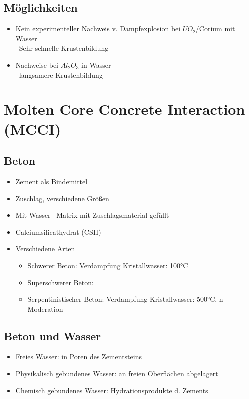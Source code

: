 \documentclass[12pt]{article}
\begin{document}
\subsection{Möglichkeiten}
\begin{itemize}
  \item Kein experimenteller Nachweis v. Dampfexplosion bei \(UO_2\)/Corium mit Wasser\\
  \textrightarrow\ Sehr schnelle Krustenbildung
  \item Nachweise bei \(Al_2O_3\) in Wasser\\
  \textrightarrow\ langsamere Krustenbildung
\end{itemize}

\section{Molten Core Concrete Interaction (MCCI)}

\subsection{Beton}
\begin{itemize}
  \item Zement als Bindemittel
  \item Zuschlag, verschiedene Größen
  \item Mit Wasser \textrightarrow\ Matrix mit Zuschlagsmaterial gefüllt
  \item Calciumsilicathydrat (CSH)
  \item Verschiedene Arten
  \begin{itemize}
    \item Schwerer Beton: Verdampfung Kristallwasser: 100°C
    \item Superschwerer Beton: 
    \item Serpentinistischer Beton: Verdampfung Kristallwasser: 500°C, n-Moderation
  \end{itemize}
\end{itemize}

\subsection{Beton und Wasser}
\begin{itemize}
  \item Freies Wasser: in Poren des Zementsteins
  \item Physikalisch gebundenes Wasser: an freien Oberflächen abgelagert
  \item Chemisch gebundenes Wasser: Hydrationsprodukte d. Zements
\end{itemize}
\end{document}
